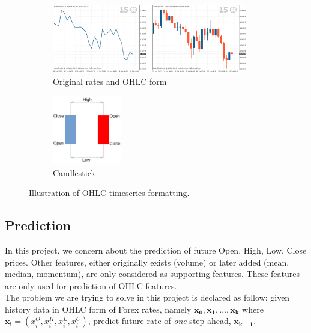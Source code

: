\documentclass[11pt]{article}
\begin{document}
\begin{figure}
    \begin{subfigure}[b]{0.5\textwidth}
      \includegraphics[height=3cm]{figs/ohlc.png}
      \caption{Original rates and OHLC form}
    \end{subfigure}
    \quad\quad\quad\quad\quad\quad\quad
    \begin{subfigure}[b]{0.2\textwidth}
      \includegraphics[height=3cm]{figs/candle.png}
      \caption{Candlestick}
    \end{subfigure}
    \caption{Illustration of OHLC timeseries formatting.}
\end{figure}

\subsection{Prediction}
In this project, we concern about the prediction of future Open, High, Low,
Close prices. Other features, either originally exists (volume) or later added
(mean, median, momentum), are only considered as supporting features. These
features are only used for prediction of OHLC features.\\
The problem we are trying to solve in this project is declared as follow: given
history data in OHLC form of Forex rates, namely $\mathbf{x_0},
\mathbf{x_1},\ldots,\mathbf{x_k}$ where $\mathbf{x_i}=(x^O_i, x^H_i, x^L_i, x^C_i )$,
predict future rate of \textit{one} step ahead, $\mathbf{x_{k+1}}$. 
\end{document}
